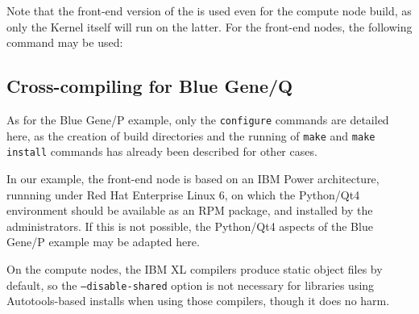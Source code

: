 \documentclass[a4paper,10pt,twoside]{article}
\begin{document}
Note that the front-end version of the \pcs is used even for
the compute node build, as only the Kernel itself will run on the
latter.
For the front-end nodes, the following command may be used:


\subsection{Cross-compiling for Blue Gene/Q}

As for the Blue Gene/P example, only the \texttt{configure} commands are
detailed here, as the creation of build directories and the running of
\texttt{make} and \texttt{make install} commands has already
been described for other cases.

In our example, the front-end node is based on an IBM Power architecture,
runnning under Red Hat Enterprise Linux 6, on which the Python/Qt4
environment should be available as an RPM package, and installed by the
administrators. If this is not possible, the Python/Qt4 aspects of the
Blue Gene/P example may be adapted here.

On the compute nodes, the IBM XL compilers produce static object files
by default, so the \texttt{--disable-shared} option is not necessary
for libraries using Autotools-based installs when using those compilers,
though it does no harm.
\end{document}
